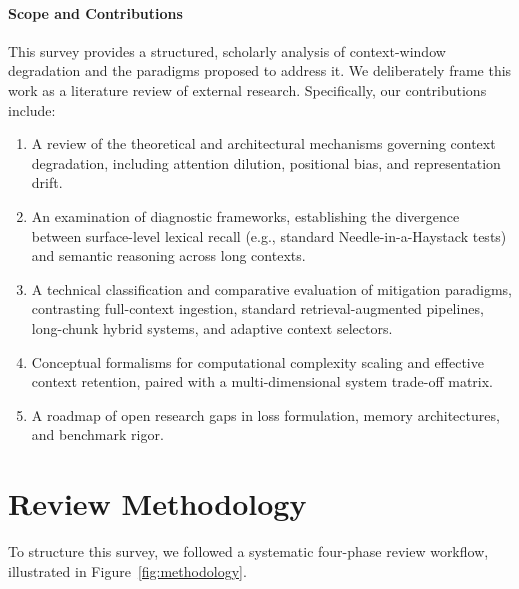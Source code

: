 \documentclass[manuscript]{acmart}
\begin{document}
\paragraph{Scope and Contributions}
This survey provides a structured, scholarly analysis of context-window degradation and the paradigms proposed to address it. We deliberately frame this work as a literature review of external research. Specifically, our contributions include:
\begin{enumerate}
    \item A review of the theoretical and architectural mechanisms governing context degradation, including attention dilution, positional bias, and representation drift.
    \item An examination of diagnostic frameworks, establishing the divergence between surface-level lexical recall (e.g., standard Needle-in-a-Haystack tests) and semantic reasoning across long contexts.
    \item A technical classification and comparative evaluation of mitigation paradigms, contrasting full-context ingestion, standard retrieval-augmented pipelines, long-chunk hybrid systems, and adaptive context selectors.
    \item Conceptual formalisms for computational complexity scaling and effective context retention, paired with a multi-dimensional system trade-off matrix.
    \item A roadmap of open research gaps in loss formulation, memory architectures, and benchmark rigor.
\end{enumerate}

\section{Review Methodology}\label{sec:methodology}
To structure this survey, we followed a systematic four-phase review workflow, illustrated in Figure~\ref{fig:methodology}.
\end{document}
